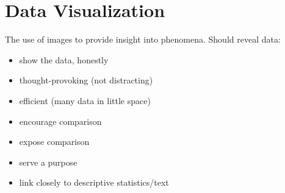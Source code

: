 \section{Data Visualization}
The use of images to provide insight into phenomena. Should reveal data:
\begin{itemize}
	\item show the data, honestly
	\item thought-provoking (not distracting)
	\item efficient (many data in little space)
	\item encourage comparison
	\item expose comparison
	\item serve a purpose
	\item link closely to descriptive statistics/text
\end{itemize}